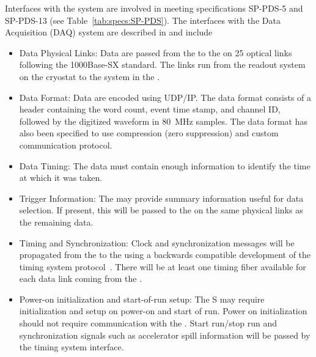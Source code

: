 
Interfaces with the  system are involved in meeting specifications SP-PDS-5
and SP-PDS-13 (see Table~\ref{tab:specs:SP-PDS}).  The  interfaces with the Data Acquisition (DAQ) system are described in  and include

\begin{itemize}

\item Data Physical Links: Data are passed from the  to the  on 25 optical links following the 1000Base-SX standard. The links run from the  readout system on the cryostat to the  system in the .

\item Data Format: Data are encoded using UDP/IP.  The data format consists of a header containing the word count, event time stamp, and channel ID, followed by the digitized waveform in \SI{80}{MHz} samples.
The data format has also been specified to use compression (zero suppression) and custom communication protocol.

\item Data Timing: The data must contain enough information to identify the time at which it was taken.

\item Trigger Information: The  may provide summary information useful for data selection. If present, this will be passed to the  on the same physical links as the remaining data.

\item Timing and Synchronization: Clock and synchronization messages will be propagated from the  to the  using a backwards compatible development of the  timing system protocol~\cite{bib:docdb1651}. There will be at least one timing fiber available for each data link coming from the . 

\item Power-on initialization and start-of-run setup:  The S may require initialization and setup on power-on and start of run. Power on initialization should not require communication with the . Start run/stop run and synchronization signals such as accelerator spill information will be passed by the timing system interface.

\end{itemize}

